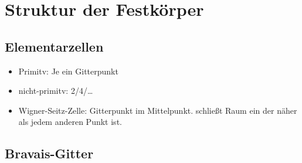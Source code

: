 \section{Struktur der Festkörper}

\subsection*{Elementarzellen}
\begin{itemize}
    \item Primitv: Je ein Gitterpunkt
    \item nicht-primitv: 2/4/\dots
    \item Wigner-Seitz-Zelle: Gitterpunkt im Mittelpunkt. schließt Raum ein der näher als jedem anderen Punkt ist.
\end{itemize}

\subsection*{Bravais-Gitter}
